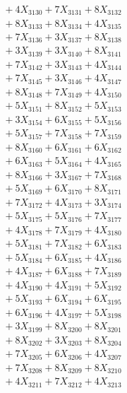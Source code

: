 \documentclass[a4paper,10pt]{article}
\begin{document}
{\begin{align}
&\;  + 4 X_{3130} + 7 X_{3131} + 8 X_{3132} \\[0.3ex]
&\;  + 8 X_{3133} + 8 X_{3134} + 4 X_{3135} \\[0.3ex]
&\;  + 7 X_{3136} + 3 X_{3137} + 8 X_{3138} \\[0.3ex]
&\;  + 3 X_{3139} + 3 X_{3140} + 8 X_{3141} \\[0.3ex]
&\;  + 7 X_{3142} + 3 X_{3143} + 4 X_{3144} \\[0.3ex]
&\;  + 7 X_{3145} + 3 X_{3146} + 4 X_{3147} \\[0.3ex]
&\;  + 8 X_{3148} + 7 X_{3149} + 4 X_{3150} \\[0.3ex]
&\;  + 5 X_{3151} + 8 X_{3152} + 5 X_{3153} \\[0.3ex]
&\;  + 3 X_{3154} + 6 X_{3155} + 5 X_{3156} \\[0.3ex]
&\;  + 5 X_{3157} + 7 X_{3158} + 7 X_{3159} \\[0.5ex]\allowbreak
&\;  + 8 X_{3160} + 6 X_{3161} + 6 X_{3162} \\[0.3ex]
&\;  + 6 X_{3163} + 5 X_{3164} + 4 X_{3165} \\[0.3ex]
&\;  + 8 X_{3166} + 3 X_{3167} + 7 X_{3168} \\[0.3ex]
&\;  + 5 X_{3169} + 6 X_{3170} + 8 X_{3171} \\[0.3ex]
&\;  + 7 X_{3172} + 4 X_{3173} + 3 X_{3174} \\[0.3ex]
&\;  + 5 X_{3175} + 5 X_{3176} + 7 X_{3177} \\[0.3ex]
&\;  + 4 X_{3178} + 7 X_{3179} + 4 X_{3180} \\[0.3ex]
&\;  + 5 X_{3181} + 7 X_{3182} + 6 X_{3183} \\[0.3ex]
&\;  + 5 X_{3184} + 6 X_{3185} + 4 X_{3186} \\[0.3ex]
&\;  + 4 X_{3187} + 6 X_{3188} + 7 X_{3189} \\[0.5ex]\allowbreak
&\;  + 4 X_{3190} + 4 X_{3191} + 5 X_{3192} \\[0.3ex]
&\;  + 5 X_{3193} + 6 X_{3194} + 6 X_{3195} \\[0.3ex]
&\;  + 6 X_{3196} + 4 X_{3197} + 5 X_{3198} \\[0.3ex]
&\;  + 3 X_{3199} + 8 X_{3200} + 8 X_{3201} \\[0.3ex]
&\;  + 8 X_{3202} + 3 X_{3203} + 8 X_{3204} \\[0.3ex]
&\;  + 7 X_{3205} + 6 X_{3206} + 4 X_{3207} \\[0.3ex]
&\;  + 7 X_{3208} + 8 X_{3209} + 8 X_{3210} \\[0.3ex]
&\;  + 4 X_{3211} + 7 X_{3212} + 4 X_{3213} \\[0.3ex]

\end{align}}
\end{document}
